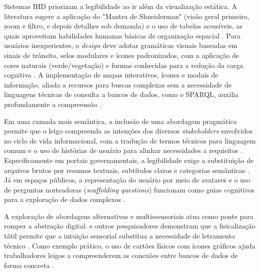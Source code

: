\documentclass[
	12pt,				%
	oneside,			%
	a4paper,			%
	english,			%
	brazil				%
	]{abntex2ppgsi}
\newcommand{\hlciteonline}[1]{\colorbox{yellow}{\citeonline{#1}}} %
\begin{document}
    Sistemas IHD priorizam a legibilidade ao ir além da visualização estática. A literatura sugere a aplicação do "Mantra de Shneiderman" (visão geral primeiro, zoom e filtro, e depois detalhes sob demanda) e o uso de tabelas acessíveis, as quais aproveitam habilidades humanas básicas de organização espacial \cite{Paredes2022317, Bartram2022, Victorelli2020Human}. Para usuários inexperientes, o \textit{design} deve adotar gramáticas visuais baseadas em sinais de trânsito, selos modulares e ícones padronizados, com a aplicação de cores naturais (verde/vegetação) e formas conhecidas para a redução da carga cognitiva \cite{Yuan20243615, Chatzimichali2021160, Lindley2020, Coleti2020TR, Capeleti2024Human}. A implementação de mapas interativos, ícones e modais de informação, aliada a recursos para buscas complexas sem a necessidade de linguagens técnicas de consulta a bancos de dados, como o SPARQL, auxilia profundamente a compreensão \cite{Belizario2023Interacao}. 

    Em uma camada mais semântica, a inclusão de uma abordagem pragmática permite que o leigo compreenda as intenções dos diversos \textit{stakeholders} envolvidos no ciclo de vida informacional, com a tradução de termos técnicos para linguagem comum e o uso de histórias de usuário para alinhar necessidades a requisitos \cite{Hornung2015, Capeleti2024Human, Strey2019Human}. Especificamente em portais governamentais, a legibilidade exige a substituição de arquivos brutos por resumos textuais, subtítulos claros e categorias semânticas \cite{Haghighati2020, Koesten2020, JoseViterbo2020}. Já em espaços públicos, a representação do usuário por meio de avatares e o uso de perguntas norteadoras (\textit{scaffolding questions}) funcionam como guias cognitivos para a exploração de dados complexos \cite{Friedman2024, Alhakamy2020246, Trajkova2020}.

    A exploração de abordagens alternativas e multissensoriais atua como ponte para romper a abstração digital. \hlciteonline{DeKreij2024} e outros pesquisadores demonstram que a fisicalização tátil permite que a intuição sensorial substitua a necessidade de letramento técnico \cite{Burzio2024, Ranasinghe2023, Lee-Smith2023, Xia2021}. Como exemplo prático, o uso de cartões físicos com ícones gráficos ajuda trabalhadores leigos a compreenderem as conexões entre bancos de dados de forma concreta \cite{Seidelin2018}.
\end{document}

